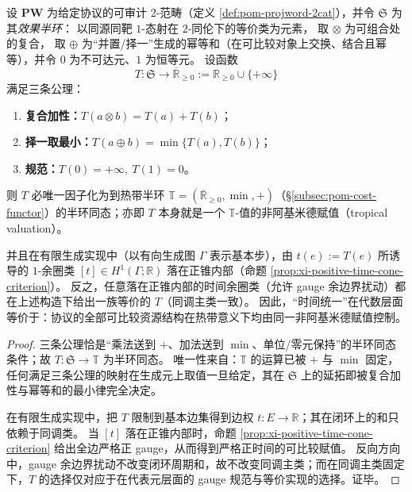 \begin{theorem}\label{thm:xi-time-tropicalization-completeness}
设 \(\mathbf{PW}\) 为给定协议的可审计 \(2\)-范畴（定义 \ref{def:pom-projword-2cat}），并令 \(\mathfrak S\) 为其\emph{效果半环}：
以同源同靶 \(1\)-态射在 \(2\)-同伦下的等价类为元素，
取 \(\otimes\) 为可组合处的复合，
取 \(\oplus\) 为“并置/择一”生成的幂等和（在可比较对象上交换、结合且幂等），并令 \(0\) 为不可达元、\(1\) 为恒等元。
设函数
\[
T:\mathfrak S\to \overline{\mathbb R}_{\ge 0}:=\mathbb R_{\ge 0}\cup\{+\infty\}
\]
满足三条公理：
\begin{enumerate}
  \item \textbf{复合加性：}\(T(a\otimes b)=T(a)+T(b)\)；
  \item \textbf{择一取最小：}\(T(a\oplus b)=\min\{T(a),T(b)\}\)；
  \item \textbf{规范：}\(T(0)=+\infty,\ T(1)=0\)。
\end{enumerate}
则 \(T\) 必唯一因子化为到热带半环 \(\mathbb T=(\overline{\mathbb R}_{\ge 0},\min,+)\)（\S\ref{subsec:pom-cost-functor}）的半环同态；亦即 \(T\) 本身就是一个 \(\mathbb T\)-值的非阿基米德赋值（tropical valuation）。
\par
并且在有限生成实现中（以有向生成图 \(\Gamma\) 表示基本步），由 \(t(e):=T(e)\) 所诱导的 \(1\)-余圈类 \([t]\in H^1(\Gamma;\mathbb R)\) 落在正锥内部（命题 \ref{prop:xi-positive-time-cone-criterion}）。
反之，任意落在正锥内部的时间余圈类（允许 gauge 余边界扰动）都在上述构造下给出一族等价的 \(T\)（同调主类一致）。
因此，“时间统一”在代数层面等价于：协议的全部可比较资源结构在热带意义下均由同一非阿基米德赋值控制。
\end{theorem}
\begin{proof}
三条公理恰是“乘法送到 \(+\)、加法送到 \(\min\)、单位/零元保持”的半环同态条件；故 \(T:\mathfrak S\to\mathbb T\) 为半环同态。
唯一性来自：\(\mathbb T\) 的运算已被 \(+\) 与 \(\min\) 固定，任何满足三条公理的映射在生成元上取值一旦给定，其在 \(\mathfrak S\) 上的延拓即被复合加性与幂等和的最小律完全决定。
\par
在有限生成实现中，把 \(T\) 限制到基本边集得到边权 \(t:E\to\mathbb R\)；其在闭环上的和只依赖于同调类。
当 \([t]\) 落在正锥内部时，命题 \ref{prop:xi-positive-time-cone-criterion} 给出全边严格正 gauge，从而得到严格正时间的可比较赋值。
反向方向中，gauge 余边界扰动不改变闭环周期和，故不改变同调主类；而在同调主类固定下，\(T\) 的选择仅对应于在代表元层面的 gauge 规范与等价实现的选择。证毕。
\end{proof}

